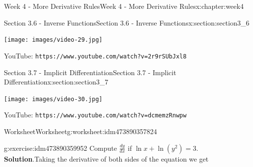 \documentclass[oneside,10pt,]{book}
\newcommand{\blocktitlefont}{\relax}
\newcommand{\mono}[1]{\texttt{#1}}
\numberwithin{equation}{section}
\newlength{\qrsize}
\newlength{\previewwidth}
\begin{document}
\begin{chapterptx}{Week 4 - More Derivative Rules}{}{Week 4 - More Derivative Rules}{}{}{x:chapter:week4}
\begin{sectionptx}{Section 3.6 - Inverse Functions}{}{Section 3.6 - Inverse Functions}{}{}{x:section:section3_6}
\begin{tcbraster}[raster columns=2, raster column skip=1pt, raster halign=center, raster force size=false, raster left skip=0pt, raster right skip=0pt]
\begin{tcolorbox}[previewstyle, width=\previewwidth]%
\texttt{[image: images/video-29.jpg]}%
\end{tcolorbox}%
\begin{tcolorbox}[qrstyle]%
{\hypersetup{urlcolor=black}}%
\end{tcolorbox}%
\begin{tcolorbox}[captionstyle]%
\small YouTube: \mono{https://www.youtube.com/watch?v=2r9rSUbJxl8}\end{tcolorbox}%
\end{tcbraster}%
\end{sectionptx}
%
%
\typeout{************************************************}
\typeout{************************************************}
%
\begin{sectionptx}{Section 3.7 - Implicit Differentiation}{}{Section 3.7 - Implicit Differentiation}{}{}{x:section:section3_7}
\setlength{\qrsize}{9em}
\setlength{\previewwidth}{\linewidth}
\addtolength{\previewwidth}{-\qrsize}
\begin{tcbraster}[raster columns=2, raster column skip=1pt, raster halign=center, raster force size=false, raster left skip=0pt, raster right skip=0pt]%
\begin{tcolorbox}[previewstyle, width=\previewwidth]%
\texttt{[image: images/video-30.jpg]}%
\end{tcolorbox}%
\begin{tcolorbox}[qrstyle]%
{\hypersetup{urlcolor=black}}%
\end{tcolorbox}%
\begin{tcolorbox}[captionstyle]%
\small YouTube: \mono{https://www.youtube.com/watch?v=dcmemzRnwpw}\end{tcolorbox}%
\end{tcbraster}%
%
%
\typeout{************************************************}
\typeout{************************************************}
%
\begin{worksheet-subsection}{Worksheet}{}{Worksheet}{}{}{g:worksheet:idm473890357824}
\begin{divisionexercise}{1}{}{}{g:exercise:idm473890359952}%
Compute \(\frac{dy}{dx}\) if \(\ln x + \ln (y^2) = 3\).%
\textbf{\blocktitlefont Solution}.\hypertarget{g:solution:idm473890359696}{}\quad{}Taking the derivative of both sides of the equation we get%

\end{divisionexercise}
\end{worksheet-subsection}
\end{sectionptx}
\end{chapterptx}
\end{document}
